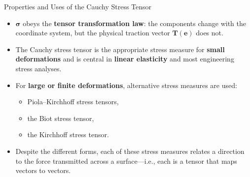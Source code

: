 \documentclass{beamer}
\begin{document}
\begin{frame}{Properties and Uses of the Cauchy Stress Tensor}

\begin{itemize}

    \item $\boldsymbol{\sigma}$ obeys the \textbf{tensor transformation law}:
    the components change with the coordinate system, but the physical
    traction vector $\mathbf{T}(\mathbf{e})$ does not.


    \item The Cauchy stress tensor is the appropriate stress measure for
          \textbf{small deformations} and is central in 
          \textbf{linear elasticity} and most engineering stress analyses.

    \item For \textbf{large or finite deformations}, alternative stress measures
          are used:
    \begin{itemize}
        \item Piola–Kirchhoff stress tensors,
        \item the Biot stress tensor,
        \item the Kirchhoff stress tensor.
    \end{itemize}

    \item Despite the different forms, each of these stress measures relates
          a direction to the force transmitted across a surface—i.e., each
          is a tensor that maps vectors to vectors.

\end{itemize}

\end{frame}
\end{document}
